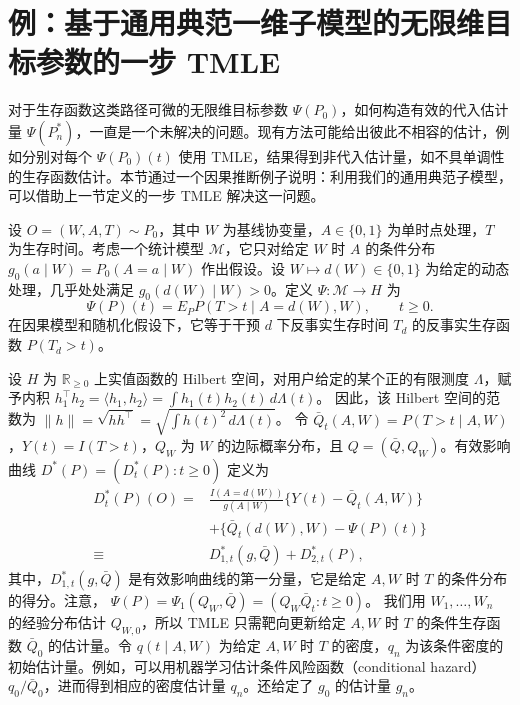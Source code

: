 \section{例：基于通用典范一维子模型的无限维目标参数的一步 TMLE}

对于生存函数这类路径可微的无限维目标参数 $\Psi(P_0)$，如何构造有效的代入估计量 $\Psi(P_n^*)$，一直是一个未解决的问题。现有方法可能给出彼此不相容的估计，例如分别对每个 $\Psi(P_0)(t)$ 使用 TMLE，结果得到非代入估计量，如不具单调性的生存函数估计。本节通过一个因果推断例子说明：利用我们的通用典范子模型，可以借助上一节定义的一步 TMLE 解决这一问题。

设 $O=(W,A,T)\sim P_0$，其中 $W$ 为基线协变量，$A\in\{0,1\}$ 为单时点处理，$T$ 为生存时间。考虑一个统计模型 $\mathcal M$，它只对给定 $W$ 时 $A$ 的条件分布
$g_0(a\mid W)=P_0(A=a\mid W)$
作出假设。设 $W\mapsto d(W)\in\{0,1\}$ 为给定的动态处理，几乎处处满足 $g_0(d(W)\mid W)>0$。定义 $\Psi:\mathcal M\to H$ 为
\[
 \Psi(P)(t)=E_PP(T>t\mid A=d(W),W),\qquad t\geq0.
\]
在因果模型和随机化假设下，它等于干预 $d$ 下反事实生存时间 $T_d$ 的反事实生存函数 $P(T_d>t)$。

设 $H$ 为 $\mathbb R_{\geq0}$ 上实值函数的 Hilbert 空间，对用户给定的某个正的有限测度 $\Lambda$，赋予内积
$h_1^\top h_2=\langle h_1,h_2\rangle=\int h_1(t)h_2(t)\,d\Lambda(t)$。
因此，该 Hilbert 空间的范数为
$\|h\|=\sqrt{hh^\top}=\sqrt{\int h(t)^2\,d\Lambda(t)}$。
令 $\bar Q_t(A,W)=P(T>t\mid A,W)$，$Y(t)=I(T>t)$，$Q_W$ 为 $W$ 的边际概率分布，且 $Q=(\bar Q,Q_W)$。有效影响曲线 $D^*(P)=(D_t^*(P):t\geq0)$ 定义为
\[
 \begin{aligned}
 D_t^*(P)(O)={}&\frac{I(A=d(W))}{g(A\mid W)}
 \{Y(t)-\bar Q_t(A,W)\}\\
 &+\{\bar Q_t(d(W),W)-\Psi(P)(t)\}\\
 \equiv{}&D_{1,t}^*(g,\bar Q)+D_{2,t}^*(P),
 \end{aligned}
\]
其中，$D_{1,t}^*(g,\bar Q)$ 是有效影响曲线的第一分量，它是给定 $A,W$ 时 $T$ 的条件分布的得分。注意，
$\Psi(P)=\Psi_1(Q_W,\bar Q)=(Q_W\bar Q_t:t\geq0)$。
我们用 $W_1,\ldots,W_n$ 的经验分布估计 $Q_{W,0}$，所以 TMLE 只需靶向更新给定 $A,W$ 时 $T$ 的条件生存函数 $\bar Q_0$ 的估计量。令 $q(t\mid A,W)$ 为给定 $A,W$ 时 $T$ 的密度，$q_n$ 为该条件密度的初始估计量。例如，可以用机器学习估计条件风险函数（conditional hazard）$q_0/\bar Q_0$，进而得到相应的密度估计量 $q_n$。还给定了 $g_0$ 的估计量 $g_n$。

